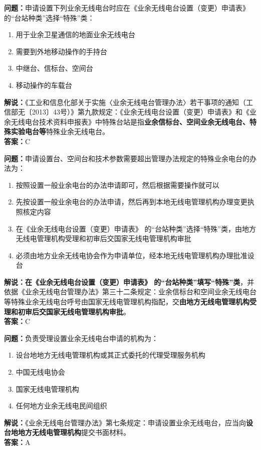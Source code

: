 \documentclass{ctexbook}
\begin{document}
\noindent\textbf{问题：}申请设置下列业余无线电台时应在《业余无线电台设置（变更）申请表》 的“台站种类”选择“特殊”类：
\begin{enumerate}[label=\Alph*), leftmargin=3em]
	\item 用于业余卫星通信的地面业余无线电台
	\item 需要到外地移动操作的手持台
	\item 中继台、信标台、空间台
	\item 移动操作的车载台
\end{enumerate}
\noindent\textbf{解说：}《工业和信息化部关于实施〈业余无线电台管理办法〉若干事项的通知（工信部无〔2013〕43号）》第九款规定：《业余无线电台设置（变更）申请表》和《业余无线电台技术资料申报表》中特殊台站是指\textbf{业余信标台、空间业余无线电台、特殊实验电台等}特殊业余无线电台。\\\noindent\textbf{答案：}C



\bigskip


\noindent\textbf{问题：}申请设置台、空间台和技术参数需要超出管理办法规定的特殊业余电台的办法为：
\begin{enumerate}[label=\Alph*), leftmargin=3em]
	\item 按照设置一般业余电台的办法申请即可，然后根据需要操作就可以
	\item 先按设置一般业余电台的办法申请，然后再到本地无线电管理机构办理变更执照核定内容
	\item 在《业余无线电台设置（变更）申请表》 的“台站种类”选择“特殊”类，由地方无线电管理机构受理和初审后交国家无线电管理机构审批
	\item 必须由地方业余无线电协会作为申请单位，经本地无线电管理机构办理批准设台
\end{enumerate}
\noindent\textbf{解说：}\textbf{在《业余无线电台设置（变更）申请表》 的“台站种类”填写“特殊”类}，并依据《业余无线电台管理办法》第三十二条规定：业余信标台和空间业余无线电台等特殊业余无线电台呼号由国家无线电管理机构指配，交\textbf{由地方无线电管理机构受理和初审后交国家无线电管理机构审批}。\\\noindent\textbf{答案：}C



\bigskip


\noindent\textbf{问题：}负责受理设置业余无线电台申请的机构为：
\begin{enumerate}[label=\Alph*), leftmargin=3em]
	\item 设台地地方无线电管理机构或其正式委托的代理受理服务机构
	\item 中国无线电协会
	\item 国家无线电管理机构
	\item 任何地方业余无线电民间组织
\end{enumerate}
\noindent\textbf{解说：}《业余无线电台管理办法》第七条规定：申请设置业余无线电台，应当向\textbf{设台地地方无线电管理机构}提交书面材料。\\\noindent\textbf{答案：}A
\end{document}
